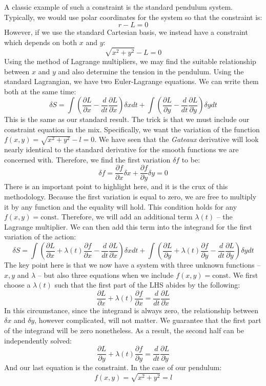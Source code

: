 A classic example of such a constraint is the standard pendulum system. Typically, we would use polar coordinates for the system so that the constraint is:
$$r-L=0$$
However, if we use the standard Cartesian basis, we instead have a constraint which depends on both $x$ and $y$:
$$\sqrt{x^2+y^2}-L=0$$
Using the method of Lagrange multipliers, we may find the suitable relationship between $x$ and $y$ and also determine the tension in the pendulum. Using the standard \gls{Lagrangian}, we have two Euler-Lagrange equations. We can write them both at the same time:
$$\delta S=\int\left({\frac{\partial L}{\partial x}-\frac{d}{dt}\frac{\partial L}{\partial \dot{x}}}\right)\delta xdt+\int\left({\frac{\partial L}{\partial y}-\frac{d}{dt}\frac{\partial L}{\partial \dot{y}}}\right)\delta ydt$$
This is the same as our standard result. The trick is that we must include our constraint equation in the mix.  Specifically, we want the variation of the function $f(x,y)=\sqrt{x^2+y^2}-l=0$. We have seen that the \textit{Gateaux} derivative will look nearly identical to the standard derivative for the smooth functions we are concerned with. Therefore, we find the first variation $\delta f$ to be:
$$\delta f=\frac{\partial f}{\partial x}\delta x+\frac{\partial f}{\partial y}\delta y=0$$
There is an important point to highlight here, and it is the crux of this methodology. Because the first variation is equal to zero, we are free to multiply it by any function and the equality will hold. This condition holds for any $f(x,y)=\text{const.}$ Therefore, we will add an additional term $\lambda(t)$ -- the Lagrange multiplier. We can then add this term into the integrand for the first variation of the action:
$$\delta S=\int\left({\frac{\partial L}{\partial x}+\lambda(t)\frac{\partial f}{\partial x}-\frac{d}{dt}\frac{\partial L}{\partial \dot{x}}}\right)\delta xdt+\int\left({\frac{\partial L}{\partial y}+\lambda(t)\frac{\partial f}{\partial y}-\frac{d}{dt}\frac{\partial L}{\partial \dot{y}}}\right)\delta ydt$$
The key point here is that we now have a system with three unknown functions -- $x,y$ and $\lambda$ -- but also three equations when we include $f(x,y)=\text{const}$. We first choose a $\lambda(t)$ such that the first part of the LHS abides by the following:
$${\frac{\partial L}{\partial x}+\lambda(t)\frac{\partial f}{\partial x}=\frac{d}{dt}\frac{\partial L}{\partial \dot{x}}}$$
In this circumstance, since the integrand is always zero, the relationship between $\delta x$ and $\delta y$, however complicated, will not matter. We guarantee that the first part of the integrand will be zero nonetheless. As a result, the second half can be independently solved:
$${\frac{\partial L}{\partial y}+\lambda(t)\frac{\partial f}{\partial y}=\frac{d}{dt}\frac{\partial L}{\partial \dot{y}}}$$
And our last equation is the constraint. In the case of our pendulum:
$$f(x,y)=\sqrt{x^2+y^2}=l$$


